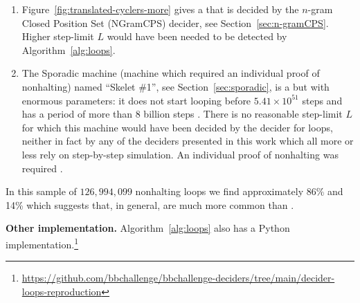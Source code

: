 \begin{enumerate}
  \item Figure~\ref{fig:translated-cyclers-more} gives a \TC that is decided by the $n$-gram Closed Position Set (NGramCPS) decider, see Section~\ref{sec:n-gramCPS}. Higher step-limit $L$ would have been needed to be detected by Algorithm~\ref{alg:loops}.
  \item The Sporadic machine (\ie machine which required an individual proof of nonhalting) named ``Skelet \#1'', see Section~\ref{sec:sporadic}, is a \TC but with enormous parameters: it does not start looping before $5.41 \times 10^{51}$ steps and has a period of more than 8 billion steps \cite{ShawnSkelet1}. There is no reasonable step-limit $L$ for which this machine would have been decided by the decider for loops, neither in fact by any of the deciders presented in this work which all more or less rely on step-by-step simulation. An individual proof of nonhalting was required \cite{busycoq}.
\end{enumerate}

In this sample of $126{,}994{,}099$ nonhalting loops we find approximately 86\% \TCs and 14\% \cyclers which suggests that, in general, \TCs are much more common than \cyclers.

\textbf{Other implementation.} Algorithm~\ref{alg:loops} also has a Python implementation.\footnote{\url{https://github.com/bbchallenge/bbchallenge-deciders/tree/main/decider-loops-reproduction}}

